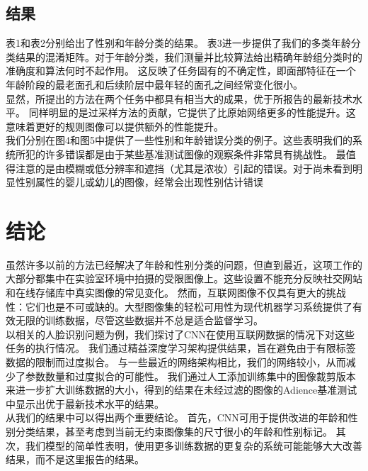 \documentclass{article}
\begin{document}
\subsection{结果}

表1和表2分别给出了性别和年龄分类的结果。
表3进一步提供了我们的多类年龄分类结果的混淆矩阵。对于年龄分类，我们测量并比较算法给出精确年龄组分类时的准确度和算法何时不起作用。
这反映了任务固有的不确定性，即面部特征在一个年龄阶段的最老面孔和后续阶层中最年轻的面孔之间经常变化很小。\\

显然，所提出的方法在两个任务中都具有相当大的成果，优于所报告的最新技术水平。
同样明显的是过采样方法的贡献，它提供了比原始网络更多的性能提升。这意味着更好的规则图像可以提供额外的性能提升。\\

我们分别在图4和图5中提供了一些性别和年龄错误分类的例子。这些表明我们的系统所犯的许多错误都是由于某些基准测试图像的观察条件非常具有挑战性。
最值得注意的是由模糊或低分辨率和遮挡（尤其是浓妆）引起的错误。对于尚未看到明显性别属性的婴儿或幼儿的图像，经常会出现性别估计错误\\
\section{结论}
虽然许多以前的方法已经解决了年龄和性别分类的问题，但直到最近，这项工作的大部分都集中在实验室环境中拍摄的受限图像上。这些设置不能充分反映社交网站和在线存储库中真实图像的常见变化。
然而，互联网图像不仅具有更大的挑战性：它们也是不可或缺的。大型图像集的轻松可用性为现代机器学习系统提供了有效无限的训练数据，尽管这些数据并不总是适合监督学习。\\

以相关的人脸识别问题为例，我们探讨了CNN在使用互联网数据的情况下对这些任务的执行情况。
我们通过精益深度学习架构提供结果，旨在避免由于有限标签数据的限制而过度拟合。
与一些最近的网络架构相比，我们的网络较小，从而减少了参数数量和过度拟合的可能性。
我们通过人工添加训练集中的图像裁剪版本来进一步扩大训练数据的大小，得到的结果在未经过滤的图像的Adience基准测试中显示出优于最新技术水平的结果。\\

从我们的结果中可以得出两个重要结论。
首先，CNN可用于提供改进的年龄和性别分类结果，甚至考虑到当前无约束图像集的尺寸很小的年龄和性别标记。
其次，我们模型的简单性表明，使用更多训练数据的更复杂的系统可能能够大大改善结果，而不是这里报告的结果。\\
\end{document}
